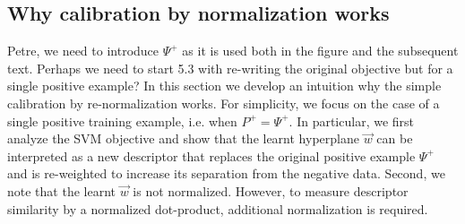   \subsection{Why calibration by normalization works} %
  \textcolor{josef}{Petre, we need to introduce $\Psi^{+}$ as it is used both in the figure and the subsequent text. Perhaps we need to start 5.3 with re-writing the original objective but for a single positive example?}
  In this section we develop an intuition why the simple calibration by re-normalization works. For simplicity, we focus on the case of a single positive training example, i.e. when $P^{+} = \Psi^{+}$.  In particular, we first analyze the SVM objective and show that the learnt hyperplane $\vec{w}$ can be interpreted as a new descriptor that replaces the original positive example $\Psi^{+}$ and is re-weighted to increase its separation from the negative data. Second, we note that the learnt $\vec{w}$ is not normalized. However, to measure descriptor similarity by a normalized dot-product, additional normalization is required.     

